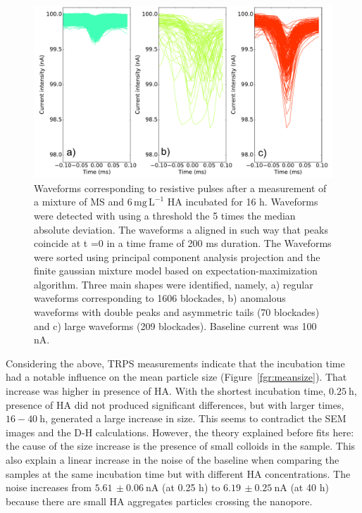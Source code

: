 \documentclass[journal=langd5,manuscript=article]{achemso}
\begin{document}
 \begin{figure}
  \includegraphics[width=\linewidth]{Figures/Block_sorting_HA6_T16.pdf}
  \caption{Waveforms corresponding to resistive pulses  after a measurement of a mixture of MS and $\mathrm{6\, mg\, L^{-1}}$ HA incubated for 16 h. Waveforms were detected with using a threshold the 5 times the median absolute deviation. The waveforms a aligned in such way that peaks coincide at t =0 in a time frame  of 200 ms duration. The Waveforms were sorted using principal component analysis projection  and the finite gaussian mixture model based on expectation-maximization algorithm. Three main shapes were identified, namely,  a) regular waveforms corresponding to 1606 blockades, b) anomalous waveforms with double peaks and asymmetric tails (70 blockades) and c) large waveforms (209 blockades). Baseline current was 100 nA.}
\label{fgr:block_sorting_HA6_T16}
\end{figure}
Considering the above, TRPS measurements indicate that the incubation time had a notable influence on the mean particle size (Figure~\ref{fgr:meansize}). That increase was higher in presence of HA. With the shortest incubation time, $0.25~\mathrm{h}$, presence of HA did not produced significant differences, but with larger times, $16 - 40~\mathrm{h}$, generated a large increase in size. This seems to contradict the SEM images and the D-H calculations. However, the theory explained before fits here: the cause of the size increase is the presence of small colloids in the sample. This also explain a linear increase in the noise of the baseline when comparing the samples at the same incubation time but with different HA concentrations. The noise increases from $5.61\,\pm 0.06~\mathrm{nA}$ (at 0.25 h) to $6.19\,\pm 0.25~\mathrm{nA}$ (at 40 h) because there are small HA aggregates particles crossing the nanopore. 
\end{document}
